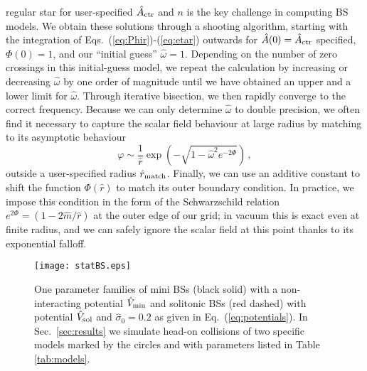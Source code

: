 \documentclass[11pt]{report}  %
\begin{document}
regular star for user-specified $\hat{A}_{\rm ctr}$ and $n$ is
the key challenge in computing BS models. We obtain
these solutions through a shooting algorithm, starting with
the integration of
Eqs.~(\ref{eq:Phir})-(\ref{eq:etar}) outwards for
$\hat{A}(0)=\hat{A}_{\rm ctr}$ specified, $\Phi(0)=1$, and our
``initial guess'' $\hat{\omega}=1$. Depending on the number
of zero crossings in this initial-guess model, we repeat
the calculation by increasing or decreasing $\hat{\omega}$
by one order of magnitude until we have obtained an upper and
a lower limit for $\hat{\omega}$. Through iterative bisection,
we then rapidly converge to the correct frequency. Because
we can only determine $\hat{\omega}$ to double precision,
we often find it necessary to capture the scalar field
behaviour at large radius by matching to its asymptotic behaviour
%
\begin{equation}
  \varphi \sim \frac{1}{\hat{r}}
  \exp\left( {-\sqrt{1-\hat{\omega}^2e^{-2\Phi}}}\right)\,,
\end{equation}
%
outside a user-specified radius $\hat{r}_{\rm match}$. Finally,
we can use an additive constant to shift the function $\Phi(\hat{r})$
to match its outer boundary condition. In practice, we impose
this condition in the form of the Schwarzschild relation
$e^{2\Phi}=(1-2\hat{m}/\hat{r})$ at the outer edge of our
grid; in vacuum this is exact even
at finite radius, and we can safely ignore the scalar field
at this point thanks to its exponential falloff.
%
\begin{figure}[b]
    \centering
    \texttt{[image: statBS.eps]}
    \caption{One parameter families of mini BSs (black solid) with a
    non-interacting potential $\hat{V}_{\rm min}$ and solitonic BSs (red dashed) with
    potential $\hat{V}_{\rm sol}$ and $\hat{\sigma}_0=0.2$
    as given in Eq.~(\ref{eq:potentials}). In Sec.~\ref{sec:results}
    we simulate head-on collisions of two specific models
    marked by the circles and with parameters listed in
    Table \ref{tab:models}.
    }
    \label{fig:statBS}
\end{figure}
%
\end{document}
